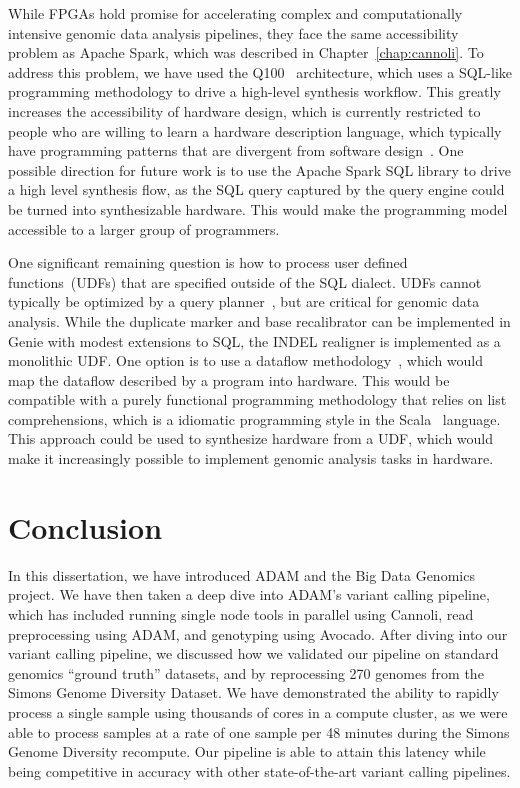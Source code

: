 \documentclass[phd]{ucbthesis}
\begin{document}
While FPGAs hold promise for accelerating complex and computationally intensive
genomic data analysis pipelines, they face the same accessibility problem
as {Apache Spark}, which was described in Chapter~\ref{chap:cannoli}. To
address this problem, we have used the Q100~\cite{wu14} architecture, which uses
a SQL-like programming methodology to drive a high-level synthesis workflow.
This greatly increases the accessibility of hardware design, which is currently
restricted to people who are willing to learn a hardware description language,
which typically have programming patterns that are divergent from software
design~\cite{bachrach12}. One possible direction for future work is to use the
{Apache Spark SQL} library to drive a high level synthesis flow, as the
SQL query captured by the query engine could be turned into synthesizable
hardware. This would make the programming model accessible to a larger group of
programmers.

One significant remaining question is how to process user defined
functions~(UDFs) that are specified outside of the SQL dialect. UDFs cannot
typically be optimized by a query planner~\cite{armbrust15, kornacker15}, but
are critical for genomic data analysis. While the duplicate marker and base
recalibrator can be implemented in {Genie} with modest extensions to SQL,
the INDEL realigner is implemented as a monolithic UDF. One option is to use a
dataflow methodology~\cite{bhattacharyya08}, which would map the dataflow
described by a program into hardware. This would be compatible with a purely
functional programming methodology that relies on list comprehensions, which is
a idiomatic programming style in the {Scala}~\cite{odersky04} language.
This approach could be used to synthesize hardware from a UDF, which would make
it increasingly possible to implement genomic analysis tasks in hardware.

\chapter{Conclusion}
\label{chap:conclusion}

In this dissertation, we have introduced ADAM and the Big Data Genomics project.
We have then taken a deep dive into ADAM's variant calling pipeline, which has
included running single node tools in parallel using Cannoli, read preprocessing
using ADAM, and genotyping using Avocado. After diving into our variant calling
pipeline, we discussed how we validated our pipeline on standard genomics
``ground truth'' datasets, and by reprocessing 270 genomes from the Simons
Genome Diversity Dataset. We have demonstrated the ability to rapidly process
a single sample using thousands of cores in a compute cluster, as we were able
to process samples at a rate of one sample per 48 minutes during the Simons
Genome Diversity recompute. Our pipeline is able to attain this latency while
being competitive in accuracy with other state-of-the-art variant calling
pipelines.
\end{document}
